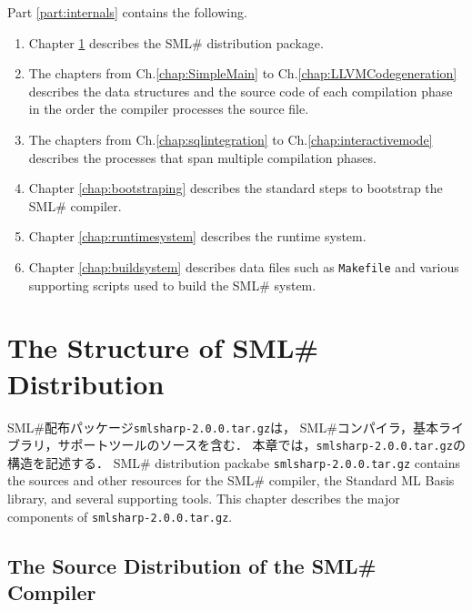\documentclass{jbook}
\newcommand{\txt}[2]{#2}
\newcommand{\smlsharp}{SML\#}
\newcommand{\code}[1]{\mbox{\large\tt #1}}
\begin{document}
	Part \ref{part:internals} contains the following.
\begin{enumerate}
\item Chapter \ref{chap:package} describes the \smlsharp{} distribution
package.
\item 
      The chapters from Ch.\ref{chap:SimpleMain} to
Ch.\ref{chap:LLVMCodegeneration} describes the data structures and the
source code of each compilation phase in the order the compiler
processes  the source file.
\item 
	The chapters from Ch.\ref{chap:sqlintegration} to
Ch.\ref{chap:interactivemode} describes the processes that span
multiple compilation phases.
\item Chapter \ref{chap:bootstraping} describes the standard steps to
bootstrap the \smlsharp{} compiler.
\item 
	Chapter \ref{chap:runtimesystem} describes the runtime system.
\item 
	Chapter \ref{chap:buildsystem} describes data files such as
\code{Makefile} and various supporting scripts used to build the
\smlsharp{} system. 
\end{enumerate}
\fi%


% 
\chapter{\txt{\smlsharp{}パッケージの構造}{The Structure of \smlsharp{} Distribution}}
\label{chap:package}

\ifjp%
	\smlsharp{}配布パッケージ\code{smlsharp-2.0.0.tar.gz}は，
\smlsharp{}コンパイラ，基本ライブラリ，サポートツールのソースを含む．
	本章では，\code{smlsharp-2.0.0.tar.gz}の構造を記述する．
\else%
	\smlsharp{} distribution packabe \code{smlsharp-2.0.0.tar.gz}
contains the sources and other resources for the \smlsharp{} compiler,
the Standard ML Basis library, and several supporting tools.
	This chapter describes the major components of
\code{smlsharp-2.0.0.tar.gz}.
\fi%

\section{\txt
{\smlsharp{}ソースパッケージの構成}
{The Source Distribution of the \smlsharp{} Compiler}
}
\end{document}
